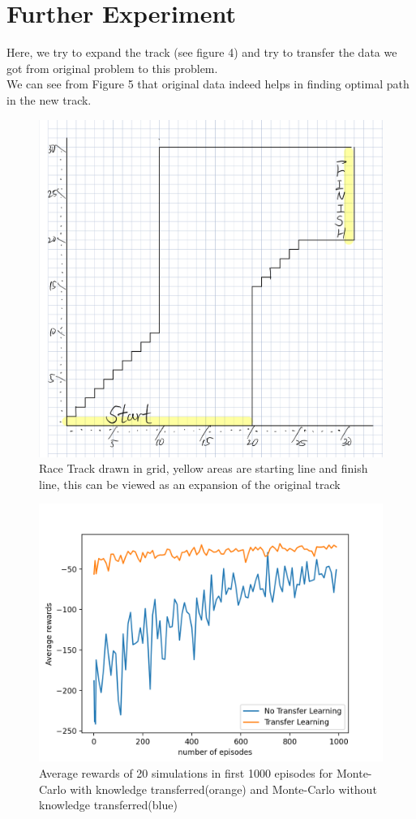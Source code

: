 \documentclass[12pt]{article}
\begin{document}
\pagebreak

\section{Further Experiment}
Here, we try to expand the track (see figure 4) and try to transfer the data we got from original problem to this problem.\\
We can see from Figure 5 that original data indeed helps in finding optimal path in the new track.


\begin{figure}
  \centering
     \includegraphics[scale = 0.16]{5.png}
  \caption{Race Track drawn in grid, yellow areas are starting line and finish line, this can be viewed as an expansion of the original track}
\end{figure}

\begin{figure}
  \centering
     \includegraphics[scale = 1.0]{10.png}
  \caption{Average rewards of 20 simulations in first 1000 episodes for Monte-Carlo with knowledge transferred(orange) and Monte-Carlo without knowledge transferred(blue)}
\end{figure}
\end{document}

